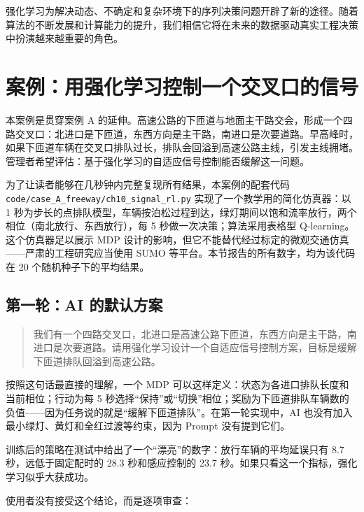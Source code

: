 强化学习为解决动态、不确定和复杂环境下的序列决策问题开辟了新的途径。随着算法的不断发展和计算能力的提升，我们相信它将在未来的数据驱动真实工程决策中扮演越来越重要的角色。

\section{案例：用强化学习控制一个交叉口的信号}
\label{sec:ch10_case}

本案例是贯穿案例 A 的延伸。高速公路的下匝道与地面主干路交会，形成一个四路交叉口：北进口是下匝道，东西方向是主干路，南进口是次要道路。早高峰时，如果下匝道车辆在交叉口排队过长，排队会回溢到高速公路主线，引发主线拥堵。管理者希望评估：基于强化学习的自适应信号控制能否缓解这一问题。

为了让读者能够在几秒钟内完整复现所有结果，本案例的配套代码 \texttt{code/case\_A\_freeway/ch10\_signal\_rl.py} 实现了一个教学用的简化仿真器：以 1 秒为步长的点排队模型，车辆按泊松过程到达，绿灯期间以饱和流率放行，两个相位（南北放行、东西放行），每 5 秒做一次决策；算法采用表格型 Q-learning。这个仿真器足以展示 MDP 设计的影响，但它不能替代经过标定的微观交通仿真——严肃的工程研究应当使用 SUMO 等平台\cite{lopez2018sumo}。本节报告的所有数字，均为该代码在 20 个随机种子下的平均结果。

\subsection{第一轮：AI 的默认方案}

\begin{quote}
我们有一个四路交叉口，北进口是高速公路下匝道，东西方向是主干路，南进口是次要道路。请用强化学习设计一个自适应信号控制方案，目标是缓解下匝道排队回溢到高速公路。
\end{quote}

按照这句话最直接的理解，一个 MDP 可以这样定义：状态为各进口排队长度和当前相位；行动为每 5 秒选择“保持”或“切换”相位；奖励为下匝道排队车辆数的负值——因为任务说的就是“缓解下匝道排队”。在第一轮实现中，AI 也没有加入最小绿灯、黄灯和全红过渡等约束，因为 Prompt 没有提到它们。

训练后的策略在测试中给出了一个“漂亮”的数字：放行车辆的平均延误只有 8.7 秒，远低于固定配时的 28.3 秒和感应控制的 23.7 秒。如果只看这一个指标，强化学习似乎大获成功。

使用者没有接受这个结论，而是逐项审查：


